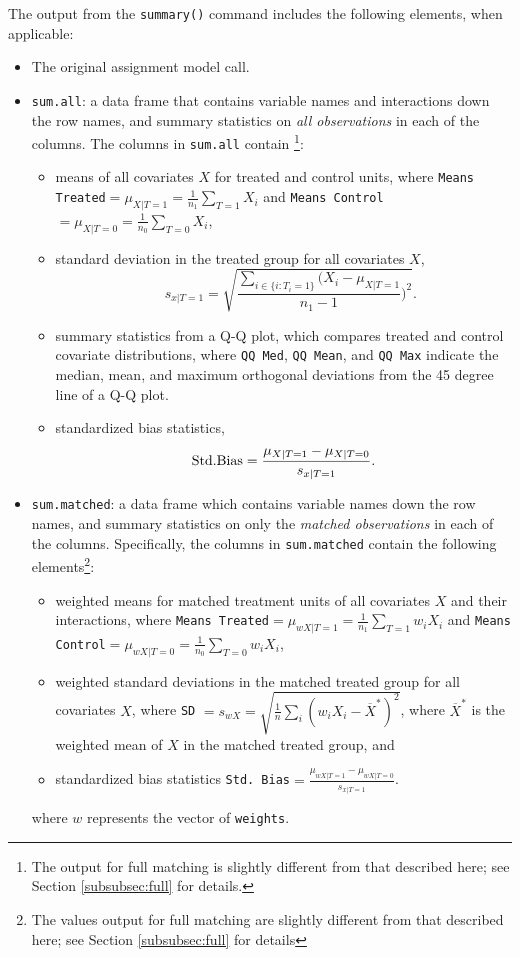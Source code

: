 The output from the \texttt{summary()} command includes the following
elements, when applicable:
\begin{itemize}
\item The original assignment model call.
\item \texttt{sum.all}: a data frame that contains variable names and
  interactions down the row names, and summary statistics on \emph{all
    observations} in each of the columns.  The columns in
  \texttt{sum.all} contain \footnote{The output for full matching is
    slightly different from that described here; see Section
    \ref{subsubsec:full} for details.}:
  \begin{itemize}
  \item means of all covariates $X$ for treated and control units,
    where \texttt{Means Treated}$= \mu_{X|T=1} = \frac{1}{n_1}
    \sum_{T=1} X_i$ and \texttt{Means Control}$= \mu_{X|T=0} =
    \frac{1}{n_0} \sum_{T=0} X_i$,
  \item standard deviation in the treated group for all covariates $X$,  
        $$\quad s_{x|T=1} = \sqrt{\frac{\sum_{i \in \{i: T_i=1\}}
        (X_i - \mu_{X|T=1}}{n_1-1})^2 }.$$
  \item summary statistics from a Q-Q plot, which compares treated and
    control covariate distributions, where \texttt{QQ Med}, \texttt{QQ
      Mean}, and \texttt{QQ Max} indicate the median, mean, and
    maximum orthogonal deviations from the 45 degree line of a Q-Q
    plot.
  \item standardized bias statistics, $${\rm Std.
      Bias}=\frac{\mu_{X|T=1} - \mu_{X|T=0}}{s_{x|T=1}}.$$
  \end{itemize}
  
\item \texttt{sum.matched}: a data frame which contains variable names
  down the row names, and summary statistics on only the \emph{matched
    observations} in each of the columns.  Specifically, the columns
  in \texttt{sum.matched} contain the following elements\footnote{The
    values output for full matching are slightly different from that
    described here; see Section \ref{subsubsec:full} for details}:
  \begin{itemize}
  \item weighted means for matched treatment units of all covariates
    $X$ and their interactions, where \texttt{Means Treated}$=
    \mu_{wX|T=1} = \frac{1}{n_1} \sum_{T=1} w_iX_i$ and \texttt{Means
      Control}$=\mu_{wX|T=0} = \frac{1}{n_0} \sum_{T=0} w_iX_i$,
  \item weighted standard deviations in the matched treated group for
    all covariates $X$, where \texttt{SD} $= s_{wX} =
    \sqrt{\frac{1}{n} \sum_{i} (w_iX_i - \overline{X}^*)^2}$, where
    $\overline{X}^*$ is the weighted mean of $X$ in the matched
    treated group, and
  \item standardized bias statistics \texttt{Std.
      Bias}$=\frac{\mu_{wX|T=1} - \mu_{wX|T=0}}{s_{x|T=1}}$.
  \end{itemize}
  where $w$ represents the vector of \texttt{weights}.
  

\end{itemize}
